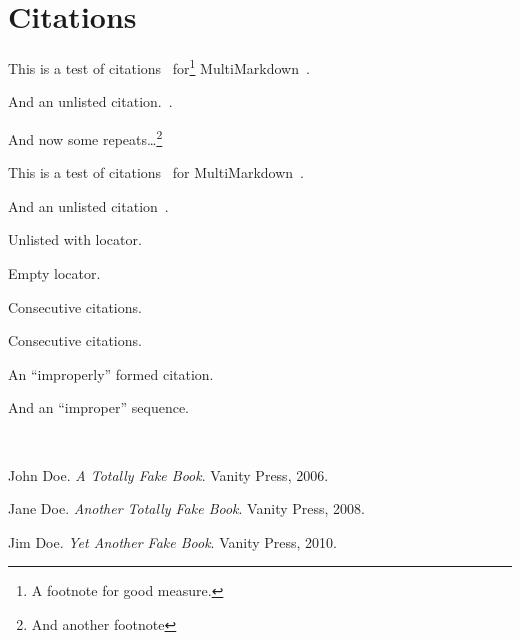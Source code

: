 
\def\mytitle{MultiMarkdown Citation Test}
\def\bibliocommand{}


\part{Citations}
\label{citations}

This is a test of citations~\citep{first} for\footnote{A footnote for good measure.} MultiMarkdown~\citep{second}.

And an unlisted citation.~\citep{Author:1988}.

And now some repeats{\ldots}\footnote{And another footnote}

This is a test of citations~\citep[p. 123]{first} for MultiMarkdown~\citep{second}.

And an unlisted citation~\citep{Author:1988}.

Unlisted with locator.~\citep[test]{Author:1988}

Empty locator.~\citep{first}

Consecutive citations.~\citep{first}~\citep{second}

Consecutive citations.~\citep{first}~\citep{second}

An ``improperly'' formed citation.~\citep{second}

And an ``improper'' sequence.~\citep{first}~\citep{second}

~\nocite{third}

\begin{thebibliography}{0}

John Doe. \emph{A Totally Fake Book}. Vanity Press, 2006.

Jane Doe. \emph{Another Totally Fake Book}. Vanity Press, 2008.

Jim Doe. \emph{Yet Another Fake Book}. Vanity Press, 2010.

\end{thebibliography}




